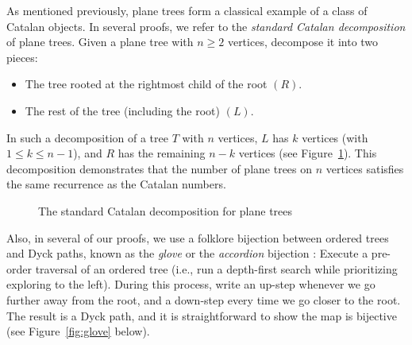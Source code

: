 \documentclass[12pt]{amsart}
\begin{document}
As mentioned previously, plane trees form a classical example of a class of Catalan objects. In several proofs, we refer to the \emph{standard Catalan decomposition} of plane trees. Given a plane tree with $n\geq2$ vertices, decompose it into two pieces:
\begin{itemize}
    \item The tree rooted at the rightmost child of the root $(R)$. 
    \item The rest of the tree (including the root) $(L)$.
\end{itemize}
In such a decomposition of a tree $T$ with $n$ vertices, $L$ has $k$ vertices (with $1\leq k\leq n-1$), and $R$ has the remaining $n-k$ vertices (see Figure~\ref{fig:cat-standard}). 
This decomposition demonstrates that the number of plane trees on $n$ vertices satisfies the same recurrence as the Catalan numbers.
\begin{figure}
    \centering
{}

    \caption{The standard Catalan decomposition for plane trees}
    \label{fig:cat-standard}
\end{figure}
Also, in several of our proofs, we use a folklore bijection between ordered trees and Dyck paths, known as the \emph{glove} or the \emph{accordion} bijection \cite{callan}: Execute a pre-order traversal of an ordered tree (i.e., run a depth-first search while prioritizing exploring to the left).
During this process, write an up-step whenever we go further away from the root, and a down-step every time we go closer to the root. 
The result is a 
Dyck path, and it is straightforward to show the map is bijective (see Figure~\ref{fig:glove} below).
\end{document}
